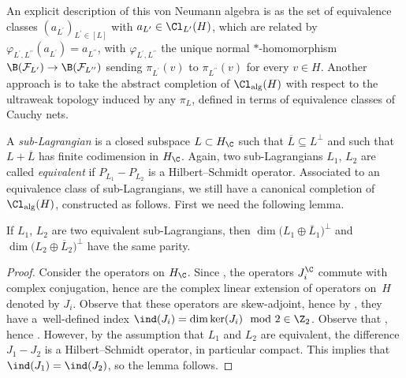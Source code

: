 \begin{Remark}
An explicit description of this von Neumann algebra is as the set of equivalence classes $(a_{L^\prime})_{L^\prime \in [L]}$ with $a_{L^\prime} \in \Cl_{L^\prime}(H)$, which are related by $\varphi_{L^\prime, L^{\prime\prime}}(a_{L^\prime}) = a_{L^{\prime\prime}}$, with $\varphi_{L^\prime, L^{\prime\prime}}$ the unique normal $*$-homomorphism $\B(\mathcal{F}_{L^\prime}) \to \B(\mathcal{F}_{L^{\prime\prime}})$ sending $\pi_{L^\prime}(v)$ to $\pi_{L^{\prime\prime}}(v)$ for every $v \in H$.
Another approach is to take the abstract completion of $\Cl_{\mathrm{alg}}(H)$ with respect to the ultraweak topology induced by any $\pi_L$, defined in terms of equivalence classes of Cauchy nets.
\end{Remark}

A \emph{sub-Lagrangian} is a closed subspace $L \subset H_\C$ such that $\overline{L} \subseteq L^\perp$ and such that $L + \overline{L}$ has finite codimension in $H_\C$.
Again, two sub-Lagrangians $L_1$, $L_2$ are called \emph{equivalent} if $P_{L_1}- P_{L_2}$ is a Hilbert--Schmidt operator.
Associated to an equivalence class of sub-Lagrangians, we still have a canonical completion of $\Cl_{\mathrm{alg}}(H)$, constructed as follows.
First we need the following lemma.

\begin{Lemma} \label{LemmaParitySubLagrangian}
If $L_1$, $L_2$ are two equivalent sub-Lagrangians, then $\dim\big(L_1 \oplus \overline{L}_1\big)^\perp$ and $\dim\big(L_2 \oplus \overline{L}_2\big)^\perp$ have the same parity.
\end{Lemma}

\begin{proof}
Consider the operators  on $H_\C$.
Since , the operators $J_i^\C$ commute with complex conjugation, hence are the complex linear extension of operators on~$H$ denoted by $J_i$.
Observe that these operators are skew-adjoint, hence by \cite{AtiyahSkew}, they have a~well-defined index $\ind(J_i) = \dim\ker(J_i) \mod 2 \in \Z_2$.
Observe that , hence .
However, by the assumption that $L_1$ and $L_2$ are equivalent, the difference $J_1 - J_2$ is a Hilbert--Schmidt operator, in particular compact.
This implies that $\ind(J_1) = \ind(J_2)$, so the lemma follows.
\end{proof}

